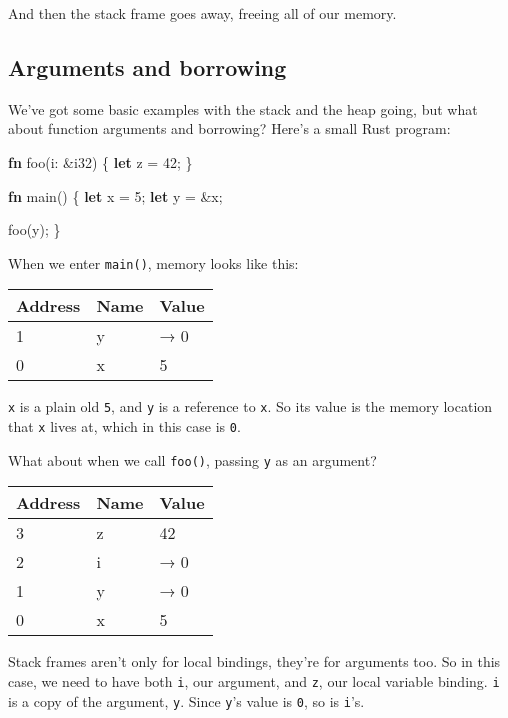 \documentclass[a4paper,]{book}
\newenvironment{Shaded}{\begin{snugshade}}{\end{snugshade}}
\newcommand{\KeywordTok}[1]{\textcolor[rgb]{0.13,0.29,0.53}{\textbf{{#1}}}}
\newcommand{\DataTypeTok}[1]{\textcolor[rgb]{0.13,0.29,0.53}{{#1}}}
\newcommand{\DecValTok}[1]{\textcolor[rgb]{0.00,0.00,0.81}{{#1}}}
\newcommand{\NormalTok}[1]{{#1}}
\begin{document}
And then the stack frame goes away, freeing all of our memory.

\subsection{Arguments and borrowing}\label{arguments-and-borrowing}

We've got some basic examples with the stack and the heap going, but
what about function arguments and borrowing? Here's a small Rust
program:

\begin{Shaded}
\begin{Highlighting}[]
\KeywordTok{fn} \NormalTok{foo(i: &}\DataTypeTok{i32}\NormalTok{) \{}
    \KeywordTok{let} \NormalTok{z = }\DecValTok{42}\NormalTok{;}
\NormalTok{\}}

\KeywordTok{fn} \NormalTok{main() \{}
    \KeywordTok{let} \NormalTok{x = }\DecValTok{5}\NormalTok{;}
    \KeywordTok{let} \NormalTok{y = &x;}

    \NormalTok{foo(y);}
\NormalTok{\}}
\end{Highlighting}
\end{Shaded}

When we enter \texttt{main()}, memory looks like this:

\begin{longtable}[c]{@{}lll@{}}
\toprule
Address & Name & Value\tabularnewline
\midrule
\endhead
1 & y & → 0\tabularnewline
0 & x & 5\tabularnewline
\bottomrule
\end{longtable}

\texttt{x} is a plain old \texttt{5}, and \texttt{y} is a reference to
\texttt{x}. So its value is the memory location that \texttt{x} lives
at, which in this case is \texttt{0}.

What about when we call \texttt{foo()}, passing \texttt{y} as an
argument?

\begin{longtable}[c]{@{}lll@{}}
\toprule
Address & Name & Value\tabularnewline
\midrule
\endhead
3 & z & 42\tabularnewline
2 & i & → 0\tabularnewline
1 & y & → 0\tabularnewline
0 & x & 5\tabularnewline
\bottomrule
\end{longtable}

Stack frames aren't only for local bindings, they're for arguments too.
So in this case, we need to have both \texttt{i}, our argument, and
\texttt{z}, our local variable binding. \texttt{i} is a copy of the
argument, \texttt{y}. Since \texttt{y}'s value is \texttt{0}, so is
\texttt{i}'s.
\end{document}
